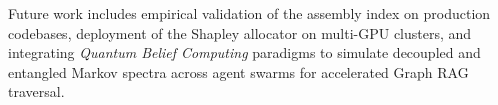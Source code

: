 \documentclass[11pt,a4paper]{article}
\begin{document}
\noindent Future work includes empirical validation of the assembly index on production codebases, deployment of the Shapley allocator on multi-GPU clusters, and integrating \emph{Quantum Belief Computing} paradigms to simulate decoupled and entangled Markov spectra across agent swarms for accelerated Graph RAG traversal.


\end{document}
